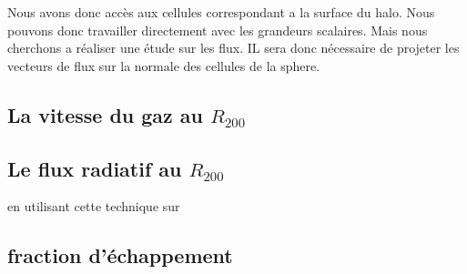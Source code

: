 Nous avons donc accès aux cellules correspondant a la surface du halo.
Nous pouvons donc travailler directement avec les grandeurs scalaires.
Mais nous cherchons a réaliser une étude sur les flux.
IL sera donc nécessaire de projeter les vecteurs de flux sur la normale des cellules de la sphere.







\subsection{La vitesse du gaz au $R_{200}$}



\subsection{Le flux radiatif au $R_{200}$}
en utilisant cette technique sur 



\subsection{fraction d'échappement}

